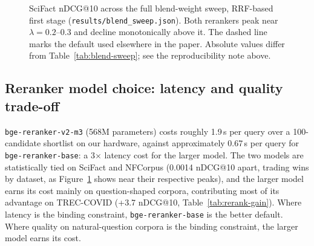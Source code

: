 \documentclass[11pt]{article}
\begin{document}
\begin{figure}[htbp]
\centering
{}
\caption{SciFact nDCG@10 across the full blend-weight sweep, RRF-based first stage (\texttt{results/blend\_sweep.json}). Both rerankers peak near $\lambda=0.2$--$0.3$ and decline monotonically above it. The dashed line marks the default used elsewhere in the paper. Absolute values differ from Table~\ref{tab:blend-sweep}; see the reproducibility note above.}
\label{fig:blend-sweep}
\end{figure}

\subsection{Reranker model choice: latency and quality trade-off}

\texttt{bge-reranker-v2-m3} (568M parameters) costs roughly 1.9\,s per query over a 100-candidate shortlist on our hardware, against approximately 0.67\,s per query for \texttt{bge-reranker-base}: a 3$\times$ latency cost for the larger model. The two models are statistically tied on SciFact and NFCorpus (0.0014 nDCG@10 apart, trading wins by dataset, as Figure~\ref{fig:blend-sweep} shows near their respective peaks), and the larger model earns its cost mainly on question-shaped corpora, contributing most of its advantage on TREC-COVID (+3.7 nDCG@10, Table~\ref{tab:rerank-gain}). Where latency is the binding constraint, \texttt{bge-reranker-base} is the better default. Where quality on natural-question corpora is the binding constraint, the larger model earns its cost.
\end{document}

